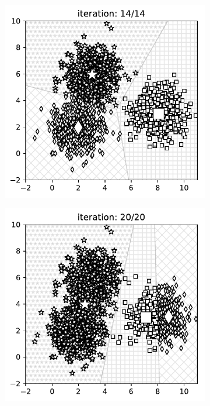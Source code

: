 \begin{itemize}
\begin{figure}[t]
\begin{subfigure}{0.325\textwidth}
        \includegraphics[width=0.99\linewidth]{ebookML_src/src/kmeans/dif_res31.pdf}
        \caption{}
        \label{fig:4_dif_resb}
        \end{subfigure}
        \begin{subfigure}{0.325\textwidth}
        \includegraphics[width=0.99\linewidth]{ebookML_src/src/kmeans/dif_res27.pdf}

\end{subfigure}
\end{figure}
\end{itemize}
